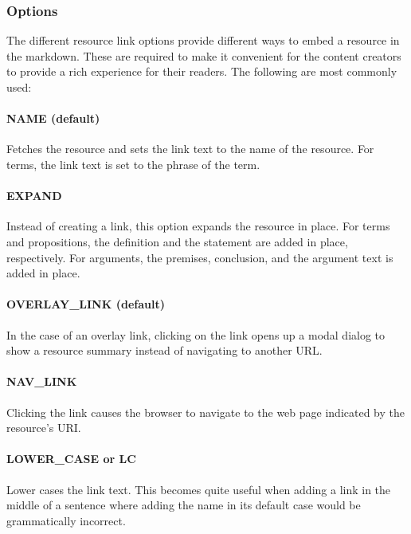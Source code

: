 \documentclass[a4paper]{article}
\begin{document}
\subsubsection{Options}

The different resource link options provide different ways to embed a resource in the markdown. These are required to make it convenient for the content creators to provide a rich experience for their readers. The following are most commonly used:


\paragraph{NAME (default)}

Fetches the resource and sets the link text to the name of the resource. For terms, the link text is set to the phrase of the term.


\paragraph{EXPAND}

Instead of creating a link, this option expands the resource in place. For terms and propositions, the definition and the statement are added in place, respectively. For arguments, the premises, conclusion, and the argument text is added in place.


\paragraph{OVERLAY\_LINK (default)}

In the case of an overlay link, clicking on the link opens up a modal dialog to show a resource summary instead of navigating to another URL.


\paragraph{NAV\_LINK}

Clicking the link causes the browser to navigate to the web page indicated by the resource's URI.


\paragraph{LOWER\_CASE or LC}

Lower cases the link text. This becomes quite useful when adding a link in the middle of a sentence where adding the name in its default case would be grammatically incorrect.
\end{document}
